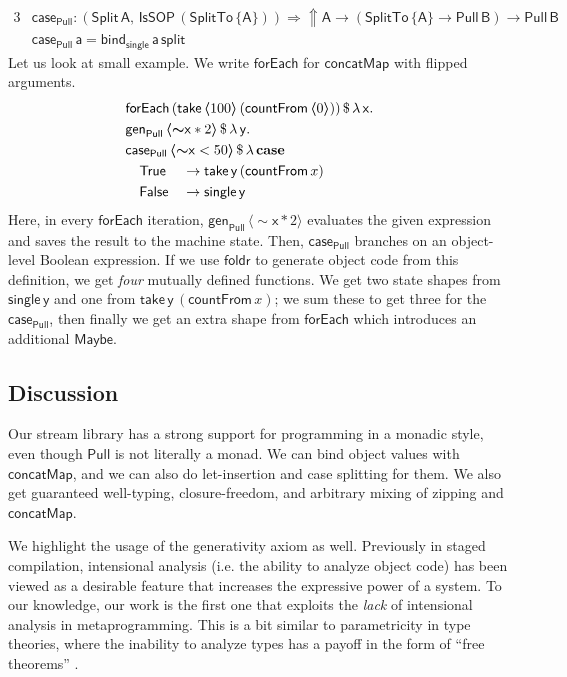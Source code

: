 \documentclass[acmsmall,screen,review,anonymous]{acmart}
\newcommand{\mit}[1]{{\mathsf{#1}}}
\newcommand{\msf}[1]{{\mathsf{#1}}}
\newcommand{\mbf}[1]{{\mathbf{#1}}}
\newcommand{\bs}[1]{\boldsymbol{#1}}
\newcommand{\ind}{\hspace{1em}}
\newcommand{\lam}{\lambda\,}
\newcommand{\vA}{\mathsf{A}}
\newcommand{\vB}{\mathsf{B}}
\newcommand{\va}{\mathsf{a}}
\newcommand{\vx}{\mathsf{x}}
\newcommand{\vy}{\mathsf{y}}
\newcommand{\IsSOP}{\msf{IsSOP}}
\newcommand{\forEach}{\msf{forEach}}
\newcommand{\single}{\msf{single}}
\newcommand{\case}{\mbf{case\,}}
\newcommand{\foldr}{\msf{foldr}}
\newcommand{\concatMap}{\msf{concatMap}}
\newcommand{\Lift}{{\Uparrow}}
\newcommand{\spl}{{\bs{\sim}}}
\newcommand{\ql}{{\bs{\langle}}}
\newcommand{\qr}{{\bs{\rangle}}}
\newcommand{\True}{\msf{True}}
\newcommand{\False}{\msf{False}}
\newcommand{\Maybe}{\msf{Maybe}}
\theoremstyle{remark}
\newcommand{\gen}{\mit{gen}}
\newcommand{\qt}[1]{\ql#1\qr}
\newcommand{\RA}{\Rightarrow}
\newcommand{\dlr}{\,\$\,}
\newcommand{\Pull}{\msf{Pull}}
\begin{document}
\begin{alignat*}{3}
  &\mit{case_\Pull} : (\mit{Split}\,\vA,\,\IsSOP\,(\mit{SplitTo}\,\{\vA\})) \RA \Lift \vA \to (\mit{SplitTo}\,\{\vA\} \to \Pull\,\vB) \to \Pull\,\vB\\
  &\mit{case_\Pull}\,\va = \mit{bind_{single}}\,\va\,\mit{split}
\end{alignat*}
Let us look at small example. We write $\mit{forEach}$ for $\concatMap$ with
flipped arguments.
\begin{alignat*}{3}
  &\hspace{-4em}\mathrlap{\mit{forEach}\,(\mit{take}\,\qt{100}\,(\mit{countFrom}\,\qt{0})) \dlr \lam \vx.}\\
  &\hspace{-4em}\mathrlap{\gen_\Pull\, \qt{\spl \vx * 2} \dlr \lam \vy.}\\
  &\hspace{-4em}\mathrlap{\mit{case_\Pull}\,\qt{\spl \vx < 50} \dlr \lam \case}\\
  &\hspace{-4em} \ind \True  &&\to \mit{take}\,\vy\,(\mit{countFrom}\,x)\\
  &\hspace{-4em} \ind \False &&\to \single\,\vy
\end{alignat*}
Here, in every $\forEach$ iteration, $\gen_\Pull\,\qt{\spl \vx * 2}$ evaluates
the given expression and saves the result to the machine state. Then,
$\mit{case_\Pull}$ branches on an object-level Boolean expression. If we use
$\foldr$ to generate object code from this definition, we get \emph{four}
mutually defined functions. We get two state shapes from $\single\,\vy$ and one
from $\mit{take}\,\vy\,(\mit{countFrom}\,x)$; we sum these to get three for the
$\mit{case_\Pull}$, then finally we get an extra shape from $\mit{forEach}$ which
introduces an additional $\Maybe$.

\subsection{Discussion}

Our stream library has a strong support for programming in a monadic style, even
though $\Pull$ is not literally a monad. We can bind object values with
$\concatMap$, and we can also do let-insertion and case splitting for them. We
also get guaranteed well-typing, closure-freedom, and arbitrary mixing of
zipping and $\concatMap$.

We highlight the usage of the generativity axiom as well. Previously in staged
compilation, intensional analysis (i.e. the ability to analyze object code) has
been viewed as a desirable feature that increases the expressive power of a
system. To our knowledge, our work is the first one that exploits the
\emph{lack} of intensional analysis in metaprogramming. This is a bit similar to
parametricity in type theories, where the inability to analyze types has a
payoff in the form of ``free theorems'' \cite{wadler89theoremsforfree}.
\end{document}
